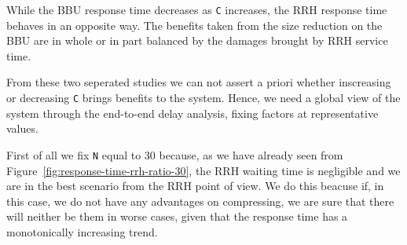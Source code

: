 \documentclass[11pt,a4paper,oneside, openright]{article}
\begin{document}
While the BBU response time decreases as \texttt{C} increases, the RRH response time behaves in an opposite way. The benefits taken from the size reduction on the BBU are in whole or in part balanced by the damages brought by RRH service time.

From these two seperated studies we can not assert a priori whether inscreasing or decreasing \texttt{C} brings benefits to the system. Hence, we need a global view of the system through the end-to-end delay analysis, fixing factors at representative values.

First of all we fix \texttt{N} equal to 30 because, as we have already seen from Figure~\ref{fig:response-time-rrh-ratio-30}, the RRH waiting time is negligible and we are in the best scenario from the RRH point of view. We do this beacuse if, in this case, we do not have any advantages on compressing, we are sure that there will neither be them in worse cases, given that the response time has a monotonically increasing trend.
\end{document}
